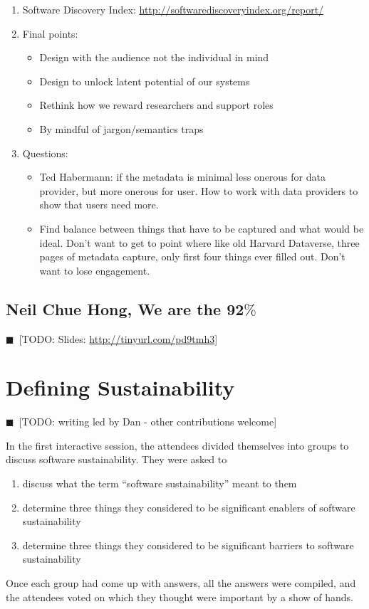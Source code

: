 \documentclass[11pt, oneside]{amsart}
\newcommand{\todo}[1]{{\color{blue}$\blacksquare$~\textsf{[TODO: #1]}}}
\begin{document}
\begin{enumerate}
\item Software Discovery Index: \url{http://softwarediscoveryindex.org/report/}
\item Final points:
\begin{itemize}
\item Design with the audience not the individual in mind
\item Design to unlock latent potential of our systems
\item Rethink how we reward researchers and support roles
\item By mindful of jargon/semantics traps
\end{itemize}
\item Questions:
\begin{itemize}
\item Ted Habermann: if the metadata is minimal less onerous for data provider,
but more onerous for user. How to work with data providers to show that users
need more.
\item Find balance between things that have to be captured and what would be
ideal. Don't want to get to point where like old Harvard Dataverse, three pages
of metadata capture, only first four things ever filled out. Don't want to lose
engagement.
\end{itemize}
\end{enumerate}

\subsection{Neil Chue Hong, We are the 92$\%$} 
\label{keynote2}

\todo{Slides: \url{http://tinyurl.com/pd9tmh3}}

\section{Defining Sustainability}

\todo{writing led by Dan - other contributions welcome}

In the first interactive session, the attendees divided themselves into groups
to discuss software sustainability. They were asked to
\begin{enumerate}
\item discuss what the term ``software sustainability'' meant to them

\item determine three things they considered to be significant enablers of
software sustainability

\item determine three things they considered to be significant barriers to
software sustainability
\end{enumerate}
Once each group had come up with answers, all the answers were compiled, and the
attendees voted on which they thought were important by a show of hands.
\end{document}
